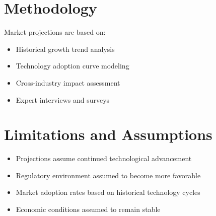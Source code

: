 \documentclass[11pt,a4paper]{report}
\begin{document}
\section{Methodology}

Market projections are based on:

\begin{itemize}
\item Historical growth trend analysis
\item Technology adoption curve modeling
\item Cross-industry impact assessment
\item Expert interviews and surveys
\end{itemize}

\section{Limitations and Assumptions}

\begin{itemize}
\item Projections assume continued technological advancement
\item Regulatory environment assumed to become more favorable
\item Market adoption rates based on historical technology cycles
\item Economic conditions assumed to remain stable
\end{itemize}
\end{document}
